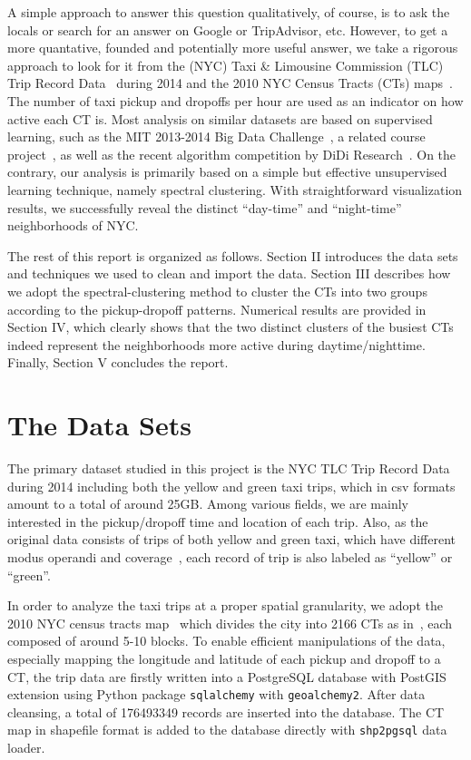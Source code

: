 \documentclass[journal]{IEEEtran}
\begin{document}
A simple approach to answer this question qualitatively, of course, is to ask
the locals or search for an answer on Google or TripAdvisor, etc. However, to
get a more quantative, founded and potentially more useful answer, we take a
rigorous approach to look for it from the (NYC) Taxi \& Limousine Commission
(TLC) Trip Record Data~\cite{nyctlc} during 2014 and the 2010 NYC Census Tracts
(CTs) maps~\cite{nyc2010ct}. The number of taxi pickup and dropoffs per hour are
used as an indicator on how active each CT is. Most analysis on
similar datasets are based on supervised learning, such as the MIT 2013-2014 Big
Data Challenge~\cite{mit2013bigdata}, a related course
project~\cite{grinberg2014predicting}, as well as the recent algorithm
competition by DiDi Research~\cite{didi2016algorithm}. On the contrary, our
analysis is primarily based on a simple but effective unsupervised learning
technique, namely spectral clustering. With straightforward visualization
results, we successfully reveal the distinct ``day-time'' and ``night-time''
neighborhoods of NYC.

The rest of this report is organized as follows. Section II introduces the data
sets and techniques we used to clean and import the data. Section III describes
how we adopt the spectral-clustering method to cluster the CTs into two groups
according to the pickup-dropoff patterns.
Numerical results are provided in Section IV, which clearly shows that the two
distinct clusters of the busiest CTs indeed represent the neighborhoods more
active during daytime/nighttime. Finally, Section V concludes the report.


\section{The Data Sets}
\label{sec:data}
The primary dataset studied in this project is the NYC TLC Trip Record
Data~\cite{nyctlc} during 2014 including both the yellow and green taxi trips,
which in csv formats amount to a total of around 25GB. Among various fields, we
are mainly interested in the pickup/dropoff time and location of each trip.
Also, as the original data consists of trips of both yellow and green taxi,
which have different modus operandi and coverage~\cite{quora_difference},
each record of trip is also labeled as ``yellow'' or ``green''. 

In order to analyze the taxi trips at a proper spatial granularity, we adopt the
2010 NYC census tracts map~\cite{nyc2010ct} which divides the city into 2166
CTs as in~\cite{schneider2015analyzing}, each composed of around 5-10 blocks. To
enable efficient manipulations of the data, especially mapping the longitude and
latitude of each pickup and dropoff to a CT, the trip data are firstly written
into a PostgreSQL database with PostGIS extension using Python package
\texttt{sqlalchemy} with \texttt{geoalchemy2}. After data cleansing, a total of
176493349 records are inserted into the database. The CT map in shapefile
format is added to the database directly with \texttt{shp2pgsql} data loader.
\end{document}
